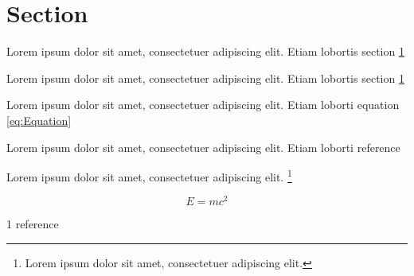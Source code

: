 \documentclass{article}
\providecommand*{\cref}{section \ref}
\begin{document}
\section{Section} \label{sec:Section}

Lorem ipsum dolor sit amet, consectetuer adipiscing elit.
Etiam lobortis section \ref{sec:Section}

Lorem ipsum dolor sit amet, consectetuer adipiscing elit.
Etiam lobortis \cref{sec:Section}

Lorem ipsum dolor sit amet, consectetuer adipiscing elit.
Etiam loborti equation \eqref{eq:Equation}

Lorem ipsum dolor sit amet, consectetuer adipiscing elit.
Etiam loborti reference \cite{cite}

Lorem ipsum dolor sit amet, consectetuer adipiscing elit.
\footnote{
 Lorem ipsum dolor sit amet, consectetuer adipiscing elit.
}

\begin{equation} \label{eq:Equation}
E=mc^2
\end{equation}

\begin{thebibliography}{1}
 reference
\end{thebibliography}
\end{document}
